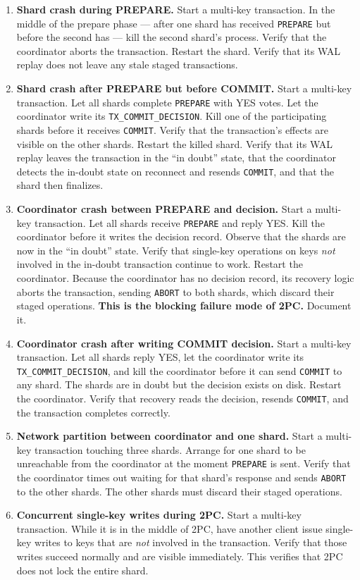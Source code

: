 \documentclass[11pt,a4paper]{article}
\begin{document}
\begin{enumerate}
\item \textbf{Shard crash during PREPARE.} Start a multi-key transaction. In the middle of the prepare phase --- after one shard has received \texttt{PREPARE} but before the second has --- kill the second shard's process. Verify that the coordinator aborts the transaction. Restart the shard. Verify that its WAL replay does not leave any stale staged transactions.

\item \textbf{Shard crash after PREPARE but before COMMIT.} Start a multi-key transaction. Let all shards complete \texttt{PREPARE} with YES votes. Let the coordinator write its \texttt{TX\_COMMIT\_DECISION}. Kill one of the participating shards before it receives \texttt{COMMIT}. Verify that the transaction's effects are visible on the other shards. Restart the killed shard. Verify that its WAL replay leaves the transaction in the ``in doubt'' state, that the coordinator detects the in-doubt state on reconnect and resends \texttt{COMMIT}, and that the shard then finalizes.

\item \textbf{Coordinator crash between PREPARE and decision.} Start a multi-key transaction. Let all shards receive \texttt{PREPARE} and reply YES. Kill the coordinator before it writes the decision record. Observe that the shards are now in the ``in doubt'' state. Verify that single-key operations on keys \textit{not} involved in the in-doubt transaction continue to work. Restart the coordinator. Because the coordinator has no decision record, its recovery logic aborts the transaction, sending \texttt{ABORT} to both shards, which discard their staged operations. \textbf{This is the blocking failure mode of 2PC.} Document it.

\item \textbf{Coordinator crash after writing COMMIT decision.} Start a multi-key transaction. Let all shards reply YES, let the coordinator write its \texttt{TX\_COMMIT\_DECISION}, and kill the coordinator before it can send \texttt{COMMIT} to any shard. The shards are in doubt but the decision exists on disk. Restart the coordinator. Verify that recovery reads the decision, resends \texttt{COMMIT}, and the transaction completes correctly.

\item \textbf{Network partition between coordinator and one shard.} Start a multi-key transaction touching three shards. Arrange for one shard to be unreachable from the coordinator at the moment \texttt{PREPARE} is sent. Verify that the coordinator times out waiting for that shard's response and sends \texttt{ABORT} to the other shards. The other shards must discard their staged operations.

\item \textbf{Concurrent single-key writes during 2PC.} Start a multi-key transaction. While it is in the middle of 2PC, have another client issue single-key writes to keys that are \textit{not} involved in the transaction. Verify that those writes succeed normally and are visible immediately. This verifies that 2PC does not lock the entire shard.
\end{enumerate}
\end{document}
